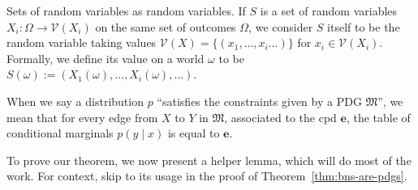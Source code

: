 \documentclass{article}
\theoremstyle{plain}
\theoremstyle{definition}
\theoremstyle{remark}
\newcommand{\V}{\mathcal V}
\newcommand{\dg}[1]{\mathfrak{#1}}
\numberwithin{equation}{section}
\begin{document}
\begin{defn} \label{def:set-rv}
	Sets of random variables as random variables. If $S$ is a set of random variables $X_i : \Omega \to \V(X_i)$ on the same set of outcomes $\Omega$, we consider $S$ itself to be the random variable taking values $\V(X) = \{(x_1, \ldots, x_i \ldots) \}$ for $x_i \in \V(X_i)$. Formally, we define its value on a world $\omega$ to be $S(\omega) := (X_1(\omega), \ldots, X_i(\omega), \ldots)$. 
\end{defn}


When we say a distribution $p$ ``satisfies the constraints given by a PDG $\dg M$'', we mean that for every edge from $X$ to $Y$ in $\dg M$, associated to the cpd $\mathbf e$, the table of conditional marginals $p(y \mid x)$ is equal to $\mathbf e$.

To prove our theorem, we now present a helper lemma, which will do most of the work. For context, skip to its usage in the proof of Theorem~\ref{thm:bns-are-pdgs}.
\end{document}
